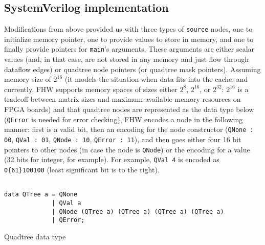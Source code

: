 \subsection{SystemVerilog implementation}

Modifications from above provided us with three types of \texttt{source} nodes, one to initialize memory pointer, one to provide values to store in memory, and one to finally provide pointers for \texttt{main}'s arguments. These arguments are either scalar values (and, in that case, are not stored in any memory and just flow through dataflow edges) or quadtree node pointers (or quadtree mask pointers). Assuming memory size of $2^{16}$ (it models the situation when data fits into the cache, and currently, FHW supports memory spaces of sizes either $2^8$, $2^{16}$, or $2^{32}$: $2^{16}$ is a tradeoff between matrix sizes and maximum available memory resources on FPGA boards) and that quadtree nodes are represented as the  data type below (\texttt{QError} is needed for error checking), FHW encodes a node in the following manner: first is a valid bit, then an encoding for the node constructor (\texttt{QNone : 00}, \texttt{QVal : 01}, \texttt{QNode : 10}, \texttt{QError : 11}), and then goes either four 16 bit pointers to other nodes (in case the node is \texttt{QNode}) or the encoding for a value (32 bits for integer, for example). For example, \texttt{QVal 4} is encoded as \texttt{0\{61\}100100} (least significant bit is to the right).

\begin{listing}[h!]
\centering
\begin{verbatim}

data QTree a = QNone 
             | QVal a 
             | QNode (QTree a) (QTree a) (QTree a) (QTree a) 
             | QError;
\end{verbatim}
\caption{Quadtree data type}
\label{lst:qtree}
\end{listing}

